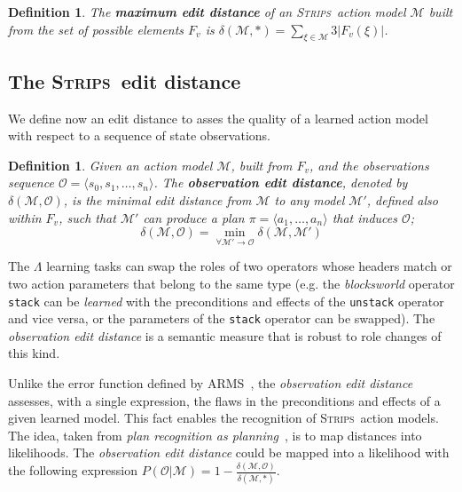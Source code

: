 \documentclass[3p,times]{elsarticle}
\newtheorem{mydefinition}[mytheorem]{Definition}
\newcommand{\strips}{\textsc{Strips}}     %
\newcommand{\tup}[1]{{\langle #1 \rangle}}
\begin{document}
\begin{mydefinition}
The \textbf{maximum edit distance} of an \strips\ action model $\mathcal{M}$ built from the set of possible elements $F_v$ is $\delta(\mathcal{M},*)=\sum_{\xi\in\mathcal{M}} 3|F_v(\xi)|$.
\end{mydefinition}


\subsection{The \strips\ edit distance}

We define now an edit distance to asses the quality of a learned action model with respect to a sequence of state observations.

\begin{mydefinition}
Given an action model $\mathcal{M}$, built from $F_v$, and the observations sequence $\mathcal{O}=\tup{s_0, s_1, \ldots, s_n}$. The {\bf observation edit distance}, denoted by  $\delta(\mathcal{M},\mathcal{O})$, is the minimal edit distance from $\mathcal{M}$ to any model $\mathcal{M}'$, defined also within $F_v$, such that $\mathcal{M}'$ can produce a plan $\pi=\tup{a_1, \ldots, a_n}$ that induces $\mathcal{O}$; \[\delta(\mathcal{M},\mathcal{O})=\min_{\forall \mathcal{M}' \rightarrow \mathcal{O}} \delta(\mathcal{M},\mathcal{M}')\]
\end{mydefinition}

The $\Lambda$ learning tasks can swap the roles of two operators whose headers match or two action parameters that belong to the same type (e.g. the {\em blocksworld} operator {\small\tt stack} can be {\em learned} with the preconditions and effects of the {\small\tt unstack} operator and vice versa, or the parameters of the {\small\tt stack} operator can be swapped). The {\em observation edit distance} is a semantic measure that is robust to role changes of this kind.

Unlike the error function defined by {\sc ARMS}~\cite{yang2007learning}, the {\em observation edit distance} assesses, with a single expression, the flaws in the preconditions and effects of a given learned model. This fact enables the recognition of \strips\ action models. The idea, taken from {\em plan recognition as planning}~\cite{ramirez2009plan}, is to map distances into likelihoods. The {\em observation edit distance} could be mapped into a likelihood with the following expression $P(\mathcal{O}|\mathcal{M})=1-\frac{\delta(\mathcal{M},\mathcal{O})}{\delta(\mathcal{M},*)}$.
\end{document}

